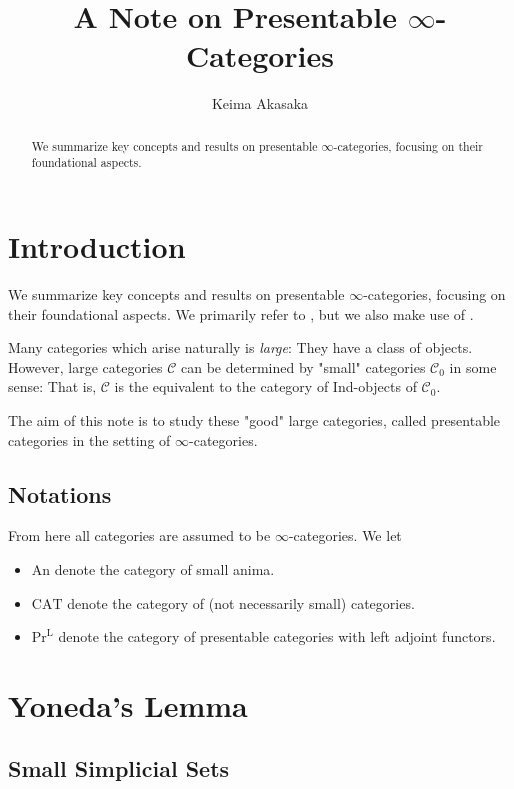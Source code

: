 \documentclass[a4paper,dvipdfmx,11pt,reqno]{amsart}
\title{A Note on Presentable \texorpdfstring{$\infty$}{infty}-Categories}
\author{Keima Akasaka}
\newcommand{\C}{\mathcal{C}}
\newcommand{\An}{\mathrm{An}}
\newcommand{\CAT}{\mathrm{CAT}}
\newcommand{\PrL}{\mathrm{Pr}^{\mathrm{L}}}
\theoremstyle{definition}
\begin{document}
\maketitle 

\begin{abstract}
  We summarize key concepts and results on presentable $\infty$-categories, focusing on their foundational aspects.
\end{abstract} 

\setcounter{tocdepth}{2}
\tableofcontents   


\section{Introduction}

We summarize key concepts and results on presentable $\infty$-categories, focusing on their foundational aspects.
We primarily refer to \cite[Chapter 5]{HTT}, but we also make use of \cite{KNP,kerodon,Land}.

Many categories which arise naturally is \textit{large}: 
They have a class of objects.
However, large categories $\C$ can be determined by "small" categories $\C_0$ in some sense:
That is, $\C$ is the equivalent to the category of Ind-objects of $\C_0$.

The aim of this note is to study these "good" large categories, called presentable categories in the setting of $\infty$-categories.

\subsection{Notations}

From here all categories are assumed to be $\infty$-categories.
We let 
\begin{itemize}
  \item $\An$ denote the category of small anima.
  \item $\CAT$ denote the category of (not necessarily small) categories.
  \item $\PrL$ denote the category of presentable categories with left adjoint functors.
\end{itemize}


\section{Yoneda's Lemma}

\subsection{Small Simplicial Sets}
\end{document}
